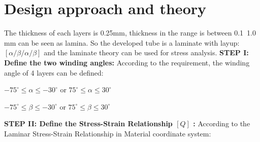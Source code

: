 \documentclass[12pt]{article}
\begin{document}
\section{Design approach and theory}
\noindent The thickness of each layers is 0.25mm, thickness in the range is between 0.1~1.0 mm can be seen as lamina. So the developed tube is a laminate with layup: $[\alpha /\beta /\alpha /\beta ]$ and the laminate theory can be used for stress analysis.\newline\newline
\noindent \textbf{STEP I: Define the two winding angles:}\newline
\noindent According to the requirement, the winding angle of 4 layers can be defined:\newline
\begin{center}
$-75^{\circ} \leq \alpha \leq -30^{\circ}$ or $75^{\circ} \leq \alpha \leq 30^{\circ}$\end{center}
\begin{center}
$-75^{\circ} \leq \beta \leq -30^{\circ}$ or $75^{\circ} \leq \beta \leq 30^{\circ}$
\end{center}
\noindent \textbf{STEP II: Define the Stress-Strain Relationship $\left[ Q \right]$ :}\newline
According to the Laminar Stress-Strain Relationship in Material coordinate system: 
\end{document}
